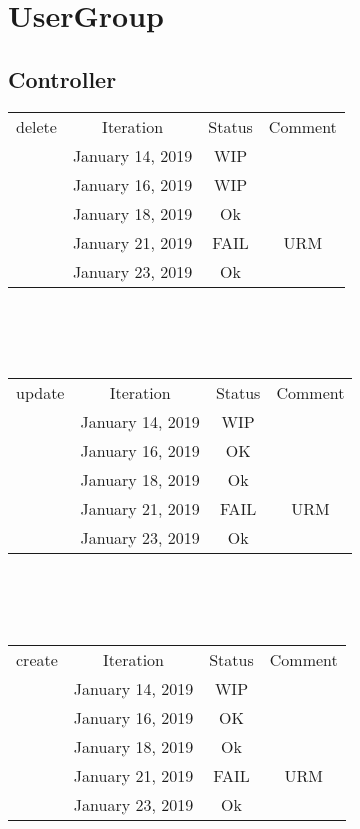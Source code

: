 \documentclass{scrreprt}
\begin{document}
\section{UserGroup}

\subsection{Controller}
	\begin{tabularx}{12cm}{X|c|c|c}
		delete & Iteration & Status & Comment \\
		& January 14, 2019 & WIP & \\
		& January 16, 2019 & WIP & \\
		& January 18, 2019 & Ok & \\	
		& January 21, 2019 & FAIL & URM \\
		& January 23, 2019 & Ok & \\
	\end{tabularx}
	\\ \\ \\	
	\begin{tabularx}{12cm}{X|c|c|c}
		update & Iteration & Status & Comment  \\	
		& January 14, 2019 & WIP & \\
		& January 16, 2019 & OK & \\
		& January 18, 2019 & Ok & \\	
		& January 21, 2019 & FAIL & URM \\
		& January 23, 2019 & Ok & \\
	\end{tabularx}
	\\ \\ \\	
	\begin{tabularx}{12cm}{X|c|c|c}
		create & Iteration & Status & Comment  \\		
		& January 14, 2019 & WIP & \\
		& January 16, 2019 & OK & \\
		& January 18, 2019 & Ok & \\	
		& January 21, 2019 & FAIL & URM \\
		& January 23, 2019 & Ok & \\
	\end{tabularx}
	\\ \\ \\
\end{document}
